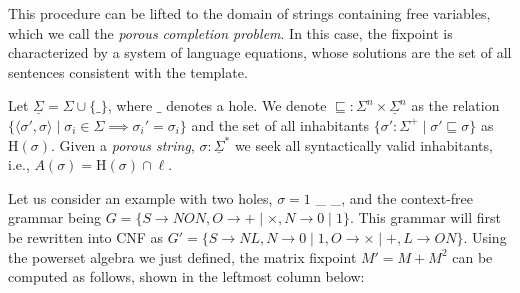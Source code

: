 \documentclass[sigplan,acmsmall,nonacm,screen]{acmart}\settopmatter{printfolios=false,printccs=false,printacmref=false}
\begin{document}
  This procedure can be lifted to the domain of strings containing free variables, which we call the \textit{porous completion problem}. In this case, the fixpoint is characterized by a system of language equations, whose solutions are the set of all sentences consistent with the template.

  \begin{definition}
    Let $\underline\Sigma = \Sigma \cup \{\_\}$, where $\_$ denotes a hole. We denote $\sqsubseteq: \Sigma^n \times \underline\Sigma^n$ as the relation $\{\langle\sigma', \sigma\rangle \mid \sigma_i \in \Sigma \implies \sigma_i' = \sigma_i\}$ and the set of all inhabitants $\{\sigma': \Sigma^+ \mid \sigma' \sqsubseteq \sigma\}$ as $\text{H}(\sigma)$. Given a \textit{porous string}, $\sigma: \underline\Sigma^*$ we seek all syntactically valid inhabitants, i.e., $A(\sigma)=\text{H}(\sigma)\cap\ell$.
  \end{definition}

  Let us consider an example with two holes, $\sigma = 1$ \_ \_, and the context-free grammar being $G=\{S\rightarrow N O N, O \rightarrow + \mid \times, N \rightarrow 0 \mid 1\}$. This grammar will first be rewritten into CNF as $G'= \{S \rightarrow N L, N \rightarrow 0 \mid 1, O \rightarrow \times \mid +, L \rightarrow O N\}$. Using the powerset algebra we just defined, the matrix fixpoint $M' = M + M^2$ can be computed as follows, shown in the leftmost column below:\vspace{0.3cm}
\end{document}
